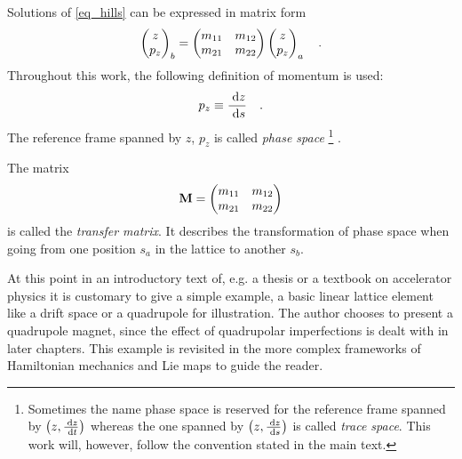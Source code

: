 Solutions of \eqref{eq_hills} can be expressed in matrix form
%
\begin{equation}
    \begin{pmatrix}
        z\\
        p_z
    \end{pmatrix}_b
    =
    \begin{pmatrix}
        m_{11} & m_{12} \\
        m_{21} & m_{22}
    \end{pmatrix}
    \begin{pmatrix}
        z\\
        p_z
    \end{pmatrix}_a
    \quad .
    \label{eq_matrix_element}
\end{equation}
%
Throughout this work, the following definition of momentum is used:
\begin{equation}
  p_z \equiv \frac{\;\text{d} z}{\;\text{d} s}
  \quad .
\end{equation}
The reference frame spanned by $z$, $p_z$ is called \emph{phase space}%
\footnote{%
Sometimes the name phase space is reserved for the reference frame spanned by $\left(z,\frac{\;\text{d} z}{\;\text{d} t}\right)$ %
whereas the one spanned by $\left(z,\frac{\;\text{d} z}{\;\text{d} s}\right)$ is called \emph{trace space}. %
This work will, however, follow the convention stated in the main text.%
}%
.

The matrix 
%
\begin{equation}
    \mathbf{M} = 
    \begin{pmatrix}
        m_{11} & m_{12} \\
        m_{21} & m_{22}
    \end{pmatrix}
    \label{eq_trmat}
\end{equation}
%
is called the \emph{transfer matrix}. It describes the transformation
of phase space when going from one position $s_a$ in the lattice to another $s_b$.

At this point in an introductory text of, e.g. a thesis or a textbook on accelerator physics
it is customary to give a simple example, a basic linear lattice element like a drift space or
a quadrupole for illustration.
The author chooses to present a quadrupole magnet, since the effect of quadrupolar imperfections
is dealt with in later chapters. This example is revisited in the more complex frameworks of
Hamiltonian mechanics and Lie maps to guide the reader.

